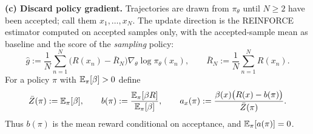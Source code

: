 \smallskip\noindent\textbf{(c) Discard policy gradient.}
Trajectories are drawn from $\pi_\theta$ until $N\ge 2$ have been accepted;
call them $x_1,\dots,x_N$. The update direction is the REINFORCE estimator
computed on accepted samples only, with the accepted-sample mean as
baseline and the score of the \emph{sampling} policy:
\begin{equation}\label{eq:discard-pg-estimator}
\hat g:=\frac1N\sum_{n=1}^N\bigl(R(x_n)-\bar R_N\bigr)\nabla_\theta\log\pi_\theta(x_n),
\qquad \bar R_N:=\frac1N\sum_{n=1}^N R(x_n).
\end{equation}
For a policy $\pi$ with $\mathbb{E}_\pi[\beta]>0$ define
\begin{equation}\label{eq:accepted-mean}
\bar Z(\pi):=\mathbb{E}_\pi[\beta],\qquad
b(\pi):=\frac{\mathbb{E}_\pi[\beta R]}{\mathbb{E}_\pi[\beta]},\qquad
a_x(\pi):=\frac{\beta(x)\bigl(R(x)-b(\pi)\bigr)}{\bar Z(\pi)} .
\end{equation}
Thus $b(\pi)$ is the mean reward conditional on acceptance, and
$\mathbb{E}_\pi[a(\pi)]=0$.

